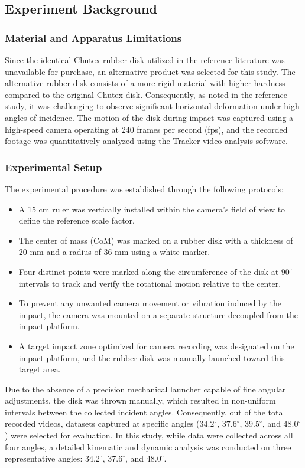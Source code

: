 \documentclass[11pt,letterpaper]{article}
\begin{document}
\subsection{Experiment Background}

\subsubsection*{Material and Apparatus Limitations}
Since the identical Chutex rubber disk utilized in the reference literature was unavailable for purchase, an alternative product was selected for this study. The alternative rubber disk consists of a more rigid material with higher hardness compared to the original Chutex disk. Consequently, as noted in the reference study, it was challenging to observe significant horizontal deformation under high angles of incidence. The motion of the disk during impact was captured using a high-speed camera operating at 240 frames per second (fps), and the recorded footage was quantitatively analyzed using the Tracker video analysis software.

\subsubsection*{Experimental Setup}
The experimental procedure was established through the following protocols:
\begin{itemize}
    \item A 15 cm ruler was vertically installed within the camera's field of view to define the reference scale factor.
    \item The center of mass (CoM) was marked on a rubber disk with a thickness of 20 mm and a radius of 36 mm using a white marker.
    \item Four distinct points were marked along the circumference of the disk at $90^{\circ}$ intervals to track and verify the rotational motion relative to the center.
    \item To prevent any unwanted camera movement or vibration induced by the impact, the camera was mounted on a separate structure decoupled from the impact platform.
    \item A target impact zone optimized for camera recording was designated on the impact platform, and the rubber disk was manually launched toward this target area.
\end{itemize}
Due to the absence of a precision mechanical launcher capable of fine angular adjustments, the disk was thrown manually, which resulted in non-uniform intervals between the collected incident angles. Consequently, out of the total recorded videos, datasets captured at specific angles ($34.2^{\circ}$, $37.6^{\circ}$, $39.5^{\circ}$, and $48.0^{\circ}$) were selected for evaluation. In this study, while data were collected across all four angles, a detailed kinematic and dynamic analysis was conducted on three representative angles: $34.2^{\circ}$, $37.6^{\circ}$, and $48.0^{\circ}$.
\end{document}

